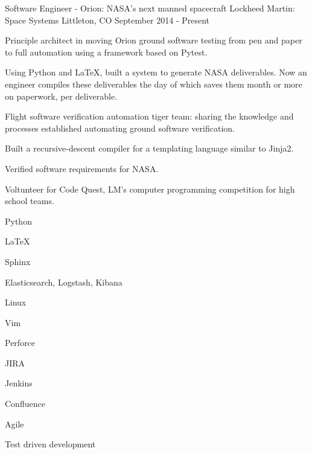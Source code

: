 

\begin{cventries}

  \cventry
    {Software Engineer - Orion: NASA's next manned spacecraft} %
    {Lockheed Martin: Space Systems} %
    {Littleton, CO} %
    {September 2014 - Present} %
    {%
      \begin{cvitems} %
        \item {Principle architect in moving Orion ground software testing from pen and paper to full automation using a framework based on Pytest.}
        \item {Using Python and LaTeX, built a system to generate NASA deliverables.  Now an engineer compiles these deliverables the day of which saves them month or more on paperwork, per deliverable.}
        \item {Flight software verification automation tiger team: sharing the knowledge and processes established automating ground software verification.}
        \item {Built a recursive-descent compiler for a templating language similar to Jinja2.}
        \item {Verified software requirements for NASA.}
        \item {Voltunteer for Code Quest, LM's computer programming competition for high school teams.}
      \end{cvitems}
    }
    \begin{cventryskills}
      \item Python
      \item LaTeX
      \item Sphinx
      \item Elasticsearch, Logstash, Kibana
      \item Linux
      \item Vim
      \item Perforce
      \item JIRA
      \item Jenkins
      \item Confluence
      \item Agile
      \item Test driven development
    \end{cventryskills}


\end{cventries}
